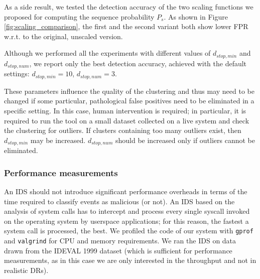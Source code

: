 As a side result, we tested the detection accuracy of the two scaling
functions we proposed for computing the sequence probability
$P_{s}$. As shown in Figure \ref{fig:scaling_comparison}, the first
and the second variant both show lower \ac{FPR} w.r.t. to the
original, unscaled version.

\begin{note}
  Although we performed all the experiments with different values of
  $d_{stop,min}$ and $d_{stop,num}$, we report only the best detection
  accuracy, achieved with the default settings: $d_{stop,min} = 10$,
  $d_{stop,num} = 3$.

  These parameters influence the quality of the clustering and thus
  may need to be changed if some particular, pathological false
  positives need to be eliminated in a specific setting. In this case,
  human intervention is required; in particular, it is required to run
  the tool on a small dataset collected on a live system and check the
  clustering for outliers. If clusters containing too many outliers
  exist, then $d_{stop,min}$ may be increased. $d_{stop,num}$ should
  be increased only if outliers cannot be eliminated.
\end{note}

\subsubsection{Performance measurements}
\label{host:syscall:perf-meas}
An \ac{IDS} should not introduce significant performance overheads in terms of the time required to classify events as malicious (or not). An \ac{IDS} based on the analysis of system calls has to intercept and process every single syscall invoked on the operating system by userspace applications; for this reason, the fastest a system call is processed, the best. We profiled the code of our system with \texttt{gprof} and \texttt{valgrind} for \ac{CPU} and memory requirements. We ran the \ac{IDS} on data drawn from the \ac{IDEVAL} 1999 dataset (which is sufficient for performance measurements, as in this case we are only interested in the throughput and not in realistic \acp{DR}).

